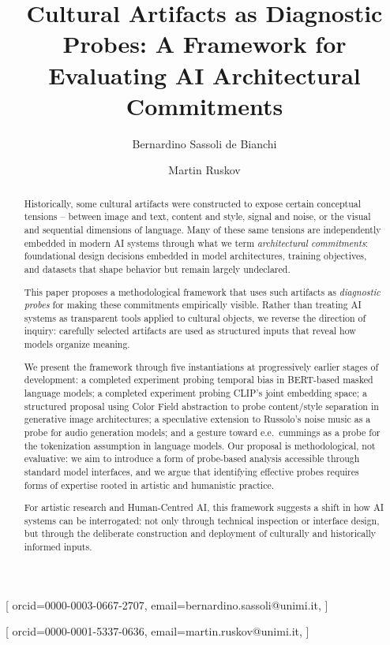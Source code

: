 \documentclass[
  twocolumn,
]{ceurart}
\begin{document}


\title{Cultural Artifacts as Diagnostic Probes: A Framework for Evaluating AI Architectural Commitments}

\author{Bernardino {Sassoli de Bianchi}}[%
  orcid=0000-0003-0667-2707,
  email=bernardino.sassoli@unimi.it,
]
\address{Universit\`a degli Studi di Milano, Milan, Italy}

\author{Martin Ruskov}[%
  orcid=0000-0001-5337-0636,
  email=martin.ruskov@unimi.it,
]

\begin{abstract}
Historically, some cultural artifacts were constructed to expose certain conceptual tensions -- between image and text, content and style, signal and noise, or the visual and sequential dimensions of language. Many of these same tensions are independently embedded in modern AI systems through what we term \emph{architectural commitments}: foundational design decisions embedded in model architectures, training objectives, and datasets that shape behavior but remain largely undeclared.

This paper proposes a methodological framework that uses such artifacts as \emph{diagnostic probes} for making these commitments empirically visible. Rather than treating AI systems as transparent tools applied to cultural objects, we reverse the direction of inquiry: carefully selected artifacts are used as structured inputs that reveal how models organize meaning.

We present the framework through five instantiations at progressively earlier stages of development: a completed experiment probing temporal bias in BERT-based masked language models; a completed experiment probing CLIP's joint embedding space; a structured proposal using Color Field abstraction to probe content/style separation in generative image architectures; a speculative extension to Russolo's noise music as a probe for audio generation models; and a gesture toward e.e.\ cummings as a probe for the tokenization assumption in language models. Our proposal is methodological, not evaluative: we aim to introduce a form of probe-based analysis accessible through standard model interfaces, and we argue that identifying effective probes requires forms of expertise rooted in artistic and humanistic practice.

For artistic research and Human-Centred AI, this framework suggests a shift in how AI systems can be interrogated: not only through technical inspection or interface design, but through the deliberate construction and deployment of culturally and historically informed inputs.
\end{abstract}
\end{document}
